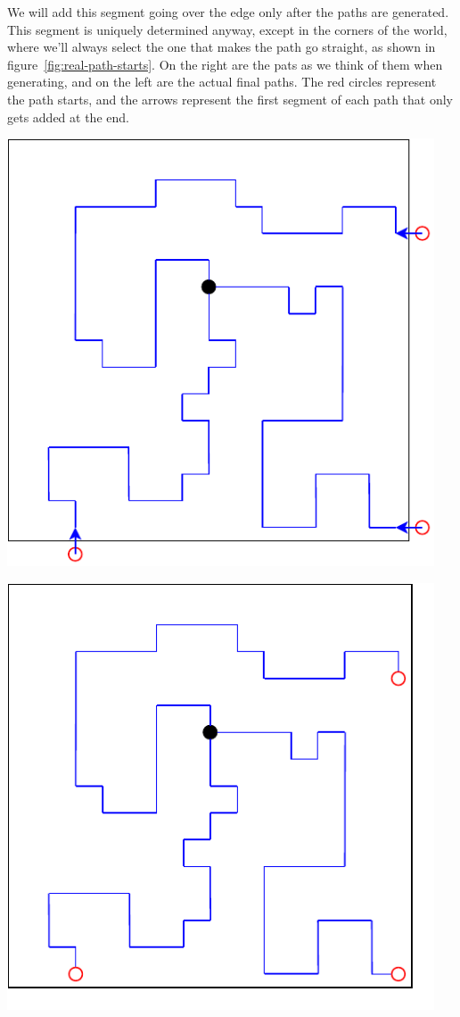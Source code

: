We will add this segment going over the edge only after the paths are generated.
This segment is uniquely determined anyway, except in the corners of the world, where we'll always select the one that makes the path go straight, as shown in figure~\ref{fig:real-path-starts}.
On the right are the pats as we think of them when generating, and on the left are the actual final paths.
The red circles represent the path starts, and the arrows represent the first segment of each path that only gets added at the end.

\begin{center}
    \captionsetup{type=figure}
    \begin{minipage}{.5\textwidth}
        \centering
        \includegraphics[width=0.95\textwidth]{img/path starts real.pdf}
    \end{minipage}%
    \begin{minipage}{.5\textwidth}
        \centering
        \includegraphics[width=0.95\textwidth]{img/path starts theory.pdf}

\end{minipage}
\end{center}
